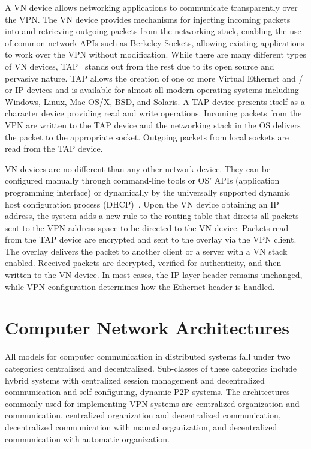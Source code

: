 A VN device allows networking applications to communicate transparently over
the VPN.  The VN device provides mechanisms for injecting incoming packets into
and retrieving outgoing packets from the networking stack, enabling the use of
common network APIs such as Berkeley Sockets, allowing existing applications to
work over the VPN without modification.  While there are many different types
of VN devices, TAP~\cite{tap} stands out from the rest due to its open source
and pervasive nature.  TAP allows the creation of one or more Virtual Ethernet
and / or IP devices and is available for almost all modern operating systems
including Windows, Linux, Mac OS/X, BSD, and Solaris.  A TAP device presents
itself as a character device providing read and write operations.  Incoming
packets from the VPN are written to the TAP device and the networking stack in
the OS delivers the packet to the appropriate socket.  Outgoing packets from
local sockets are read from the TAP device.

VN devices are no different than any other network device.  They can be
configured manually through command-line tools or OS' APIs (application
programming interface) or dynamically by the universally supported dynamic host
configuration process (DHCP)~\cite{dhcp0, dhcp1}.  Upon the VN device obtaining
an IP address, the system adds a new rule to the routing table that directs all
packets sent to the VPN address space to be directed to the VN device.  Packets
read from the TAP device are encrypted and sent to the overlay via the VPN
client.  The overlay delivers the packet to another client or a server with a
VN stack enabled.  Received packets are decrypted, verified for authenticity,
and then written to the VN device.  In most cases, the IP layer header remains
unchanged, while VPN configuration determines how the Ethernet header is
handled.

\section{Computer Network Architectures}

All models for computer communication in distributed systems fall under two
categories:  centralized and decentralized.  Sub-classes of these categories
include hybrid systems with centralized session management and decentralized
communication and self-configuring, dynamic P2P systems.  The architectures
commonly used for implementing VPN systems are centralized organization and
communication, centralized organization and decentralized communication,
decentralized communication with manual organization, and decentralized
communication with automatic organization.

